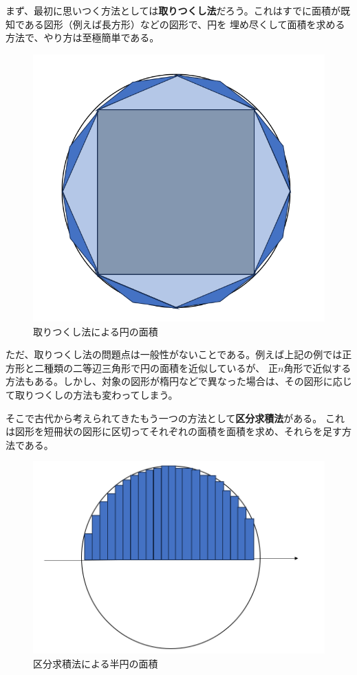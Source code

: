 \documentclass[a4j,dvipdfmx]{jsarticle}
\begin{document}
                まず、最初に思いつく方法としては\textbf{取りつくし法}だろう。これはすでに面積が既知である図形（例えば長方形）などの図形で、円を
                埋め尽くして面積を求める方法で、やり方は至極簡単である。
                \begin{figure}[h]
                    \centering
                    \includegraphics[scale=0.35]{img/QuuNote/Tritukusi.png}
                    \caption{取りつくし法による円の面積}
                \end{figure}

                ただ、取りつくし法の問題点は一般性がないことである。例えば上記の例では正方形と二種類の二等辺三角形で円の面積を近似しているが、
                正$n$角形で近似する方法もある。しかし、対象の図形が楕円などで異なった場合は、その図形に応じて取りつくしの方法も変わってしまう。

                そこで古代から考えられてきたもう一つの方法として\textbf{区分求積法}がある。
                これは図形を短冊状の図形に区切ってそれぞれの面積を面積を求め、それらを足す方法である。
                \begin{figure}[h]
                    \centering
                    \includegraphics[scale=0.35]{img/QuuNote/kubunkyuseki.png}
                    \caption{区分求積法による半円の面積}
                \end{figure}
\end{document}
